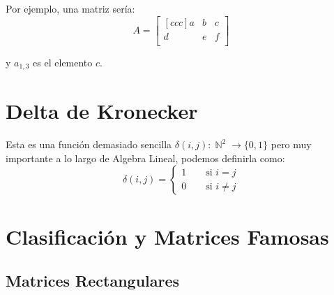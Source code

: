 \documentclass[12pt]{report}                                    %
\DeclareMathOperator \Space {\quad}                             %
\DeclareMathOperator \Naturals  {\mathbb{N}}                     %
\begin{document}
                Por ejemplo, una matriz sería:
                \begin{equation*}
                    A =
                    \begin{bmatrix}[ccc]
                        a & b & c   \\
                        d & e & f   \\
                    \end{bmatrix}
                \end{equation*}

                y $a_{1,3}$ es el elemento $c$.





        \section{Delta de Kronecker}

            Esta es una función demasiado sencilla $\delta(i,j): \Naturals^2 \to \{0,1\}$
            pero muy importante a lo largo de Algebra Lineal, podemos definirla como:
            \begin{equation}
                \delta(i,j) =
                \begin{cases}
                    1 \Space \text{ si } i = j \\
                    0 \Space \text{ si } i \neq j
                \end{cases}
            \end{equation}









        \clearpage
        \section{Clasificación y Matrices Famosas}

            \subsection{Matrices Rectangulares}
\end{document}
